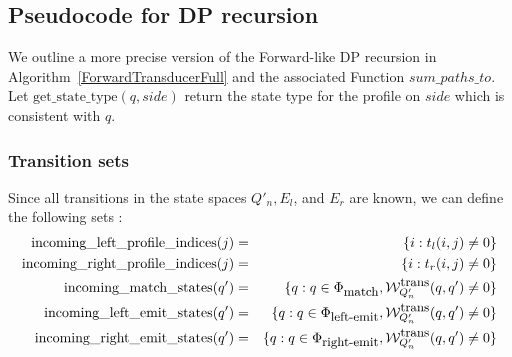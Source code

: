 \documentclass{article}
\newcommand\States{\Phi}
\newcommand\statesof[1]{\States_{#1}}
\newcommand\weight{{\cal W}}
\newcommand\weightfunof[1]{\weight_{#1}}
\newcommand\transweightfun[1]{\weightfunof{#1}^{\mbox{\small trans}}}
\newcommand\stateset[1]{\statesof{\mbox{\small #1}}}
\newcommand\matchsuffix{match}
\newcommand\leftemitsuffix{left-emit}
\newcommand\rightemitsuffix{right-emit}
\newcommand\matchstates{\stateset{\matchsuffix}}
\newcommand\leftemitstates{\stateset{\leftemitsuffix}}
\newcommand\rightemitstates{\stateset{\rightemitsuffix}}
\newcommand\newTransName[1]{t_{#1}}
\newcommand\getprofiletype{\mbox{get\_state\_type}}
\newcommand\incomingLeftProfile[1]{\mbox{incoming\_left\_profile\_indices}(#1)}
\newcommand\incomingRightProfile[1]{\mbox{incoming\_right\_profile\_indices}(#1)}
\newcommand\incomingM[1]{\mbox{incoming\_match\_states}(#1)}
\newcommand\incomingL[1]{\mbox{incoming\_left\_emit\_states}(#1)}
\newcommand\incomingR[1]{\mbox{incoming\_right\_emit\_states}(#1)}
\newcommand\addToDPFunction{sum\_paths\_to}
\begin{document}
\subsection{Pseudocode for DP recursion}

We outline a more precise version of the Forward-like DP recursion in Algorithm~\ref{ForwardTransducerFull} and the associated Function $\addToDPFunction$. 
Let $\getprofiletype(q,side)$ return the state type for the profile on $side$ which is consistent with $q$.  

\subsubsection{Transition sets}

Since  all transitions in the state spaces $Q'_n, E_l$, and $E_r$ are known, we can define the following sets :
\begin{eqnarray*}
\incomingLeftProfile{j} &=& \{i: \newTransName{l}(i,j) \neq 0 \} \\
\incomingRightProfile{j} &=& \{i: \newTransName{r}(i,j) \neq 0 \} \\
\incomingM{q'} &=& \{ q:q \in \matchstates, \transweightfun{Q'_n}(q,q') \neq 0 \}\\
\incomingL{q'} &=& \{ q:q \in \leftemitstates, \transweightfun{Q'_n}(q,q') \neq 0 \}\\
\incomingR{q'} &=& \{ q:q \in \rightemitstates, \transweightfun{Q'_n}(q,q') \neq 0 \}
\end{eqnarray*}
\end{document}
